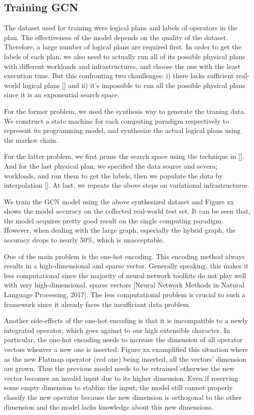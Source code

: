 \subsection{Training GCN}
The dataset used for training were logical plans and labels of operators in the plan. 
The effectiveness of the model depends on the quality of the dataset. 
Therefore, a large number of logical plans are required first. 
In order to get the labels of each plan, we also need to actually run all of its possible physical plans with different workloads and infrastructures, and choose the one with the least execution time. 
But this confronting two chanllenges: 
i) there lacks sufficient real-world logical plans [] and 
ii) it's impossible to run all the possible physical plans since it is an exponential search space. 

For the former problem, we used the synthesis way to generate the traning data. 
We construct a state machine for each computing paradigm respectively to represent its programming model, and synthesize the actual logical plans using the markov chain. 

For the latter problem, we first prune the search space using the technique in []. 
And for the last physical plan, we specified the data source and severa; workloads, and run them to get the labels, then we populate the data by interpolation []. 
At last, we repeate the above steps on variational infrastructures.

We train the GCN model using the above synthesized dataset and Figure xx shows the model accuracy on the collected real-world test set. 
It can be seen that, the model acquires pretty good result on the single computing paradigm. 
However, when dealing with the large graph, especially the hybrid graph, the accuracy drops to nearly 50\%, which is unacceptable.

One of the main problem is the one-hot encoding. 
This encoding method always results in a high-dimensional and sparse vector. 
Generally speaking, this makes it less computational since the majority of neural network toolkits do not play well with very high-dimensional, sparse vectors [Neural Network Methods in Natural Language Processing, 2017]. 
The less computational problem is crucial to such a framework since it already faces the insufficiant data problem. 

Another side-effects of the one-hot encoding is that it is imcompatible to a newly integrated operator, which goes against to our high extensible character. 
In particular, the one-hot encoding needs to increase the dimension of all operator vectors whenver a new one is inserted. 
Figure xx examplified this situation where as the new Flatmap operator (red one) being inserted, all the vectors' dimension are grown. 
Thus the previous model needs to be retrained otherwise the new vector becomes an invalid input due to its higher dimension. 
Even if reserving some empty dimension to stablize the input, the model still cannot properly classify the new operator because the new dimension is orthogonal to the other dimension and the model lacks knowledge about this new dimensions.

